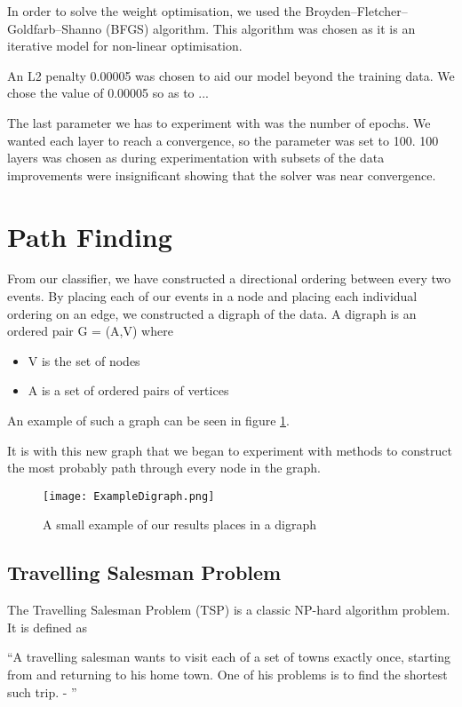 \documentclass[bsc,frontabs,twoside,singlespacing,parskip,deptreport]{infthesis}     %
\begin{document}
 In order to solve the weight optimisation, we used the Broyden–Fletcher–Goldfarb–Shanno (BFGS) algorithm.
 This algorithm was chosen as it is an iterative model for non-linear optimisation.

 An L2 penalty 0.00005 was chosen to aid our model beyond the training data.
 We chose the value of 0.00005 so as to ...

 The last parameter we has to experiment with was the number of epochs.
 We wanted each layer to reach a convergence, so the parameter was set to 100.
 100 layers was chosen as during experimentation with subsets of the data improvements were
 insignificant showing that the solver was near convergence.

 \section{Path Finding} \label{chapter:graphing}
From our classifier, we have constructed a directional ordering between every two events.
By placing each of our events in a node and placing each individual ordering on an edge, we constructed
a digraph of the data.
A digraph is an ordered pair G = (A,V) where\cite{bang2008digraphs}
\begin{itemize}
  \item V is the set of nodes
  \item A is a set of ordered pairs of vertices
\end{itemize}
An example of such a graph can be seen in figure \ref{fig:digraph}.

It is with this new graph that we began to experiment with methods to construct the most probably path through every
node in the graph.


\begin{figure}
  \centering
  \texttt{[image: ExampleDigraph.png]}
  \caption{A small example of our results places in a digraph}
  \label{fig:digraph}
 \end{figure}

\subsection{Travelling Salesman Problem}
The Travelling Salesman Problem (TSP) is a classic NP-hard algorithm problem\cite{junger1995traveling}.%
It is defined as
\begin{center}
\enquote{A travelling salesman wants to visit each of a set of towns exactly once, starting
from and returning to his home town. One of his problems is to find the shortest
such trip. - \cite{junger1995traveling}}
\end{center}
\end{document}
